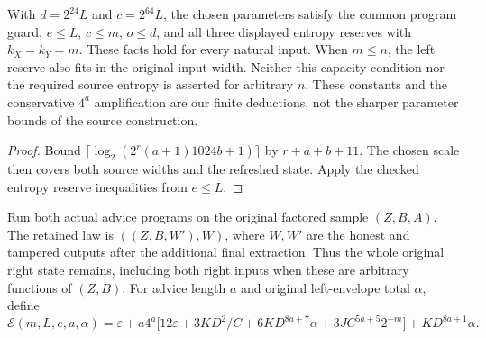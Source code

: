 \begin{theorem}
  \label{thm:lowerbounds-algebraic-advice-parameters}
  \leanok
  With $d=2^{24}L$ and $c=2^{64}L$, the chosen parameters satisfy the common program guard,
  $e\le L$, $c\le m$, $o\le d$, and all three displayed entropy
  reserves with $k_X=k_Y=m$. These facts hold for every natural input.
  When $m\le n$, the left reserve also fits in the original input width.
  Neither this capacity condition nor the required source entropy is
  asserted for arbitrary $n$. These constants and the conservative
  $4^a$ amplification are our finite deductions, not the sharper
  parameter bounds of the source construction.
\end{theorem}
\begin{proof}
  \leanok
  Bound $\lceil\log_2(2^r(a+1)1024b+1)\rceil$ by $r+a+b+11$.
  The chosen scale then covers both source widths and the refreshed
  state. Apply the checked entropy reserve inequalities from $e\le L$.
\end{proof}

\begin{definition}
  \label{def:lowerbounds-algebraic-advice-extraction}
  \leanok
  Run both actual advice programs on the original factored sample
  $(Z,B,A)$. The retained law is $((Z,B,W'),W)$, where $W,W'$ are
  the honest and tampered outputs after the additional final extraction.
  Thus the whole original right state remains, including both right
  inputs when these are arbitrary functions of $(Z,B)$.
  For advice length $a$ and original left-envelope total $\alpha$, define
  \[
    \mathcal E(m,L,e,a,\alpha)=\varepsilon+
      a4^a\bigl[12\varepsilon+3KD^2/C+
        6KD^{8a+7}\alpha+3JC^{5a+5}2^{-m}\bigr]
      +KD^{8a+1}\alpha.
  \]
\end{definition}

